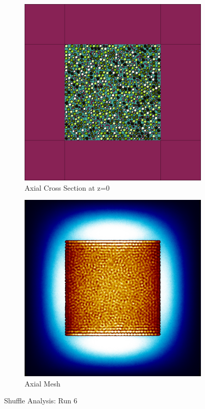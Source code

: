\begin{figure}[H]
\begin{subfigure}{0.45\textwidth}
  \includegraphics[width=0.95\linewidth]{figures/6012345/6012345-v}
  \caption{Axial Cross Section at z=0 }
  \label{fig:6012345-v}
\end{subfigure}
%
\begin{subfigure}{0.45\textwidth}
  \includegraphics[width=0.95\linewidth]{figures/6012345/6012345-vm}
  \caption{Axial Mesh}
  \label{fig:6012345-vm}
\end{subfigure}
%
\caption{Shuffle Analysis: Run 6}
\label{fig:0-60}
\end{figure}